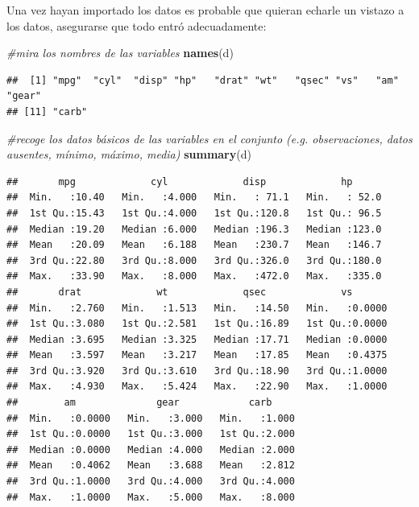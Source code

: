 \documentclass[
]{article}
\newenvironment{Shaded}{\begin{snugshade}}{\end{snugshade}}
\newcommand{\CommentTok}[1]{\textcolor[rgb]{0.56,0.35,0.01}{\textit{#1}}}
\newcommand{\FunctionTok}[1]{\textcolor[rgb]{0.13,0.29,0.53}{\textbf{#1}}}
\newcommand{\NormalTok}[1]{#1}
\begin{document}
Una vez hayan importado los datos es probable que quieran echarle un
vistazo a los datos, asegurarse que todo entró adecuadamente:

\begin{Shaded}
\begin{Highlighting}[]
\CommentTok{\#mira los nombres de las variables}
\FunctionTok{names}\NormalTok{(d)}
\end{Highlighting}
\end{Shaded}

\begin{verbatim}
##  [1] "mpg"  "cyl"  "disp" "hp"   "drat" "wt"   "qsec" "vs"   "am"   "gear"
## [11] "carb"
\end{verbatim}

\begin{Shaded}
\begin{Highlighting}[]
\CommentTok{\#recoge los datos básicos de las variables en el conjunto (e.g. observaciones, datos ausentes, mínimo, máximo, media)}
\FunctionTok{summary}\NormalTok{(d)}
\end{Highlighting}
\end{Shaded}

\begin{verbatim}
##       mpg             cyl             disp             hp       
##  Min.   :10.40   Min.   :4.000   Min.   : 71.1   Min.   : 52.0  
##  1st Qu.:15.43   1st Qu.:4.000   1st Qu.:120.8   1st Qu.: 96.5  
##  Median :19.20   Median :6.000   Median :196.3   Median :123.0  
##  Mean   :20.09   Mean   :6.188   Mean   :230.7   Mean   :146.7  
##  3rd Qu.:22.80   3rd Qu.:8.000   3rd Qu.:326.0   3rd Qu.:180.0  
##  Max.   :33.90   Max.   :8.000   Max.   :472.0   Max.   :335.0  
##       drat             wt             qsec             vs        
##  Min.   :2.760   Min.   :1.513   Min.   :14.50   Min.   :0.0000  
##  1st Qu.:3.080   1st Qu.:2.581   1st Qu.:16.89   1st Qu.:0.0000  
##  Median :3.695   Median :3.325   Median :17.71   Median :0.0000  
##  Mean   :3.597   Mean   :3.217   Mean   :17.85   Mean   :0.4375  
##  3rd Qu.:3.920   3rd Qu.:3.610   3rd Qu.:18.90   3rd Qu.:1.0000  
##  Max.   :4.930   Max.   :5.424   Max.   :22.90   Max.   :1.0000  
##        am              gear            carb      
##  Min.   :0.0000   Min.   :3.000   Min.   :1.000  
##  1st Qu.:0.0000   1st Qu.:3.000   1st Qu.:2.000  
##  Median :0.0000   Median :4.000   Median :2.000  
##  Mean   :0.4062   Mean   :3.688   Mean   :2.812  
##  3rd Qu.:1.0000   3rd Qu.:4.000   3rd Qu.:4.000  
##  Max.   :1.0000   Max.   :5.000   Max.   :8.000
\end{verbatim}
\end{document}
